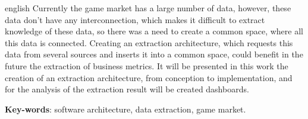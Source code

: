 \begin{resumo}[Abstract]
 \begin{otherlanguage*}{english}
 	Currently the game market has a large number of data, however, these data don't have any interconnection, which makes it difficult to extract knowledge of these data, so there was a need to create a common space, where all this data is connected. Creating an extraction architecture, which requests this data from several sources and inserts it into a common space, could benefit in the future the extraction of business metrics. It will be presented in this work the creation of an extraction architecture, from conception to implementation, and for the analysis of the extraction result will be created dashboards.

   \vspace{\onelineskip}
 
   \noindent 
   \textbf{Key-words}: software architecture, data extraction, game market.
 \end{otherlanguage*}
\end{resumo}
